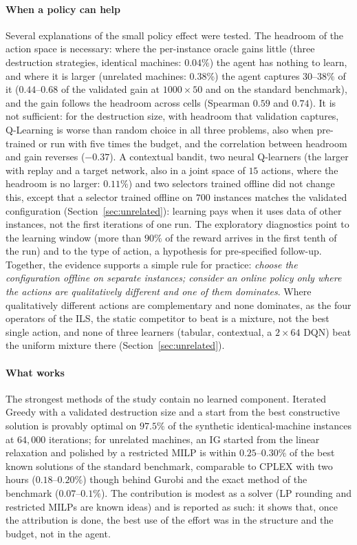 \paragraph{When a policy can help}
Several explanations of the small policy effect were tested. The headroom of the action space is necessary: where the per-instance oracle gains little (three destruction strategies, identical machines: $0.04\%$) the agent has
nothing to learn, and where it is larger (unrelated machines: $0.38\%$) the agent captures $30$--$38\%$ of it ($0.44$--$0.68$ of the validated gain at $1000\times50$ and on the standard benchmark), and the gain follows the headroom across cells (Spearman $0.59$ and $0.74$). It is not sufficient:
for the destruction size, with headroom that validation captures, Q-Learning is worse than random choice in all three problems, also when pre-trained or run with five times the budget, and the correlation between headroom and gain
reverses ($-0.37$). A contextual bandit, two neural Q-learners (the larger with replay and a target network, also in a joint space of $15$ actions, where the headroom is no larger: $0.11\%$) and two selectors trained offline did not change this, except that a selector trained offline on $700$ instances matches the validated configuration (Section~\ref{sec:unrelated}): learning pays when it uses data of other instances, not the first iterations of one run. The exploratory diagnostics point to the learning window (more than $90\%$ of the reward arrives in the first tenth of the run) and to the type of action, a hypothesis for pre-specified follow-up. Together, the
evidence supports a simple rule for practice: \emph{choose the configuration offline on separate instances; consider an online policy only where the actions are qualitatively different and one of them dominates}. Where qualitatively different actions are complementary and none dominates, as the four operators of the ILS, the static competitor to beat is a mixture, not the best single action, and none of three learners (tabular, contextual, a $2\times64$ DQN) beat the uniform mixture there (Section~\ref{sec:unrelated}).

\paragraph{What works}
The strongest methods of the study contain no learned component. Iterated Greedy with a validated destruction size and a start from the best constructive solution is provably optimal on $97.5\%$ of the synthetic identical-machine instances
at $64{,}000$ iterations; for unrelated machines, an IG started from the linear relaxation and polished by a restricted MILP is within $0.25$--$0.30\%$ of the best known solutions of the standard benchmark, comparable to CPLEX with two hours
($0.18$--$0.20\%$) though behind Gurobi and the exact method of the benchmark ($0.07$--$0.1\%$). The contribution is modest as a solver (LP rounding and restricted MILPs are known ideas) and is reported as such: it shows that, once the
attribution is done, the best use of the effort was in the structure and the budget, not in the agent.

